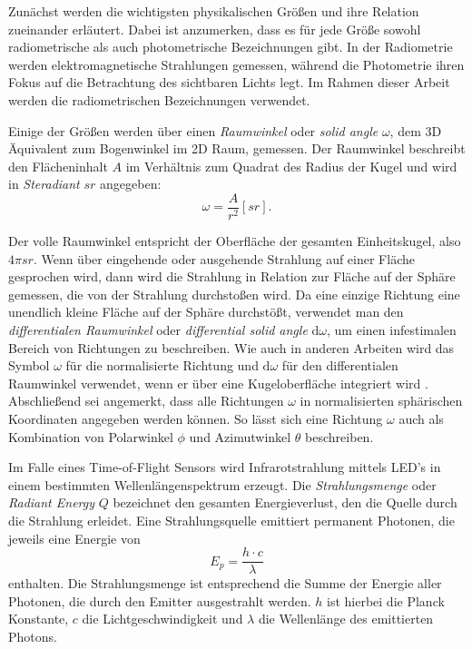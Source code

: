 \documentclass[thesis.tex]{subfiles}
\begin{document}
Zunächst werden die wichtigsten physikalischen Größen und ihre Relation zueinander erläutert. Dabei ist anzumerken, dass es für jede Größe sowohl radiometrische als auch photometrische Bezeichnungen gibt. In der Radiometrie werden elektromagnetische Strahlungen gemessen, während die Photometrie ihren Fokus auf die Betrachtung des sichtbaren Lichts legt. Im Rahmen dieser Arbeit werden die radiometrischen Bezeichnungen verwendet.

Einige der Größen werden über einen \emph{Raumwinkel} oder \emph{solid angle} $\omega$, dem 3D Äquivalent zum Bogenwinkel im 2D Raum, gemessen. Der Raumwinkel beschreibt den Flächeninhalt $A$ im Verhältnis zum Quadrat des Radius der Kugel und wird in \emph{Steradiant} $sr$ angegeben:
\begin{equation}
\omega = \frac{A}{r^2}[sr].
\end{equation}

Der volle Raumwinkel entspricht der Oberfläche der gesamten Einheitskugel, also $4 \pi sr$.
Wenn über eingehende oder ausgehende Strahlung auf einer Fläche gesprochen wird, dann wird die Strahlung in Relation zur Fläche auf der Sphäre gemessen, die von der Strahlung durchstoßen wird. Da eine einzige Richtung eine unendlich kleine Fläche auf der Sphäre durchstößt, verwendet man den \emph{differentialen Raumwinkel} oder \emph{differential solid angle} $\mathrm{d}\omega$, um einen infestimalen Bereich von Richtungen zu beschreiben.
Wie auch in anderen Arbeiten wird das Symbol $\omega$ für die normalisierte Richtung und $\mathrm{d}\omega$ für den differentialen Raumwinkel verwendet, wenn er über eine Kugeloberfläche integriert wird \cite{bib:Wynn2000}. Abschließend sei angemerkt, dass alle Richtungen $\omega$ in normalisierten sphärischen Koordinaten angegeben werden können. So lässt sich eine Richtung $\omega$ auch als Kombination von Polarwinkel $\phi$ und Azimutwinkel $\theta$ beschreiben.

Im Falle eines Time-of-Flight Sensors wird Infrarotstrahlung mittels LED's in einem bestimmten Wellenlängenspektrum erzeugt. Die \emph{Strahlungsmenge} oder \emph{Radiant Energy} $Q$ bezeichnet den gesamten Energieverlust, den die Quelle durch die Strahlung erleidet. Eine Strahlungsquelle emittiert permanent Photonen, die jeweils eine Energie von 
\begin{equation}
E_{p} = \frac{h \cdot c}{\lambda}
\end{equation}
enthalten. Die Strahlungsmenge ist entsprechend die Summe der Energie aller Photonen, die durch den Emitter ausgestrahlt werden. $h$ ist hierbei die Planck Konstante, $c$ die Lichtgeschwindigkeit und $\lambda$ die Wellenlänge des emittierten Photons.
\end{document}

